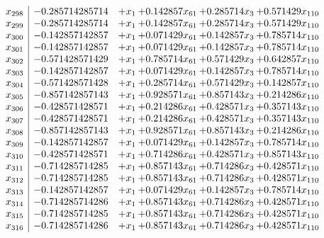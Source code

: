 \documentclass[11pt]{article}
\begin{document}
\[\begin{array}{c| c c@{\hskip 2pt} c@{\hskip 2pt} c@{\hskip 2pt} c@{\hskip 2pt} }
 x_{298}   &  -0.285714285714 & +  x_{1} & + 0.142857 x_{61} & + 0.285714 x_{3} & + 0.571429 x_{110}\\
 x_{299}   &  -0.285714285714 & +  x_{1} & + 0.142857 x_{61} & + 0.285714 x_{3} & + 0.571429 x_{110}\\
 x_{300}   &  -0.142857142857 & +  x_{1} & + 0.071429 x_{61} & + 0.142857 x_{3} & + 0.785714 x_{110}\\
 x_{301}   &  -0.142857142857 & +  x_{1} & + 0.071429 x_{61} & + 0.142857 x_{3} & + 0.785714 x_{110}\\
 x_{302}   &  -0.571428571429 & +  x_{1} & + 0.785714 x_{61} & + 0.571429 x_{3} & + 0.642857 x_{110}\\
 x_{303}   &  -0.142857142857 & +  x_{1} & + 0.071429 x_{61} & + 0.142857 x_{3} & + 0.785714 x_{110}\\
 x_{304}   &  -0.571428571428 & +  x_{1} & + 0.285714 x_{61} & + 0.571429 x_{3} & + 0.142857 x_{110}\\
 x_{305}   &  -0.857142857143 & +  x_{1} & + 0.928571 x_{61} & + 0.857143 x_{3} & + 0.214286 x_{110}\\
 x_{306}   &  -0.428571428571 & +  x_{1} & + 0.214286 x_{61} & + 0.428571 x_{3} & + 0.357143 x_{110}\\
 x_{307}   &  -0.428571428571 & +  x_{1} & + 0.214286 x_{61} & + 0.428571 x_{3} & + 0.357143 x_{110}\\
 x_{308}   &  -0.857142857143 & +  x_{1} & + 0.928571 x_{61} & + 0.857143 x_{3} & + 0.214286 x_{110}\\
 x_{309}   &  -0.142857142857 & +  x_{1} & + 0.071429 x_{61} & + 0.142857 x_{3} & + 0.785714 x_{110}\\
 x_{310}   &  -0.428571428571 & +  x_{1} & + 0.714286 x_{61} & + 0.428571 x_{3} & + 0.857143 x_{110}\\
 x_{311}   &  -0.714285714285 & +  x_{1} & + 0.857143 x_{61} & + 0.714286 x_{3} & + 0.428571 x_{110}\\
 x_{312}   &  -0.714285714285 & +  x_{1} & + 0.857143 x_{61} & + 0.714286 x_{3} & + 0.428571 x_{110}\\
 x_{313}   &  -0.142857142857 & +  x_{1} & + 0.071429 x_{61} & + 0.142857 x_{3} & + 0.785714 x_{110}\\
 x_{314}   &  -0.714285714286 & +  x_{1} & + 0.857143 x_{61} & + 0.714286 x_{3} & + 0.428571 x_{110}\\
 x_{315}   &  -0.714285714285 & +  x_{1} & + 0.857143 x_{61} & + 0.714286 x_{3} & + 0.428571 x_{110}\\
 x_{316}   &  -0.714285714286 & +  x_{1} & + 0.857143 x_{61} & + 0.714286 x_{3} & + 0.428571 x_{110}\\

\end{array}\]
\end{document}
